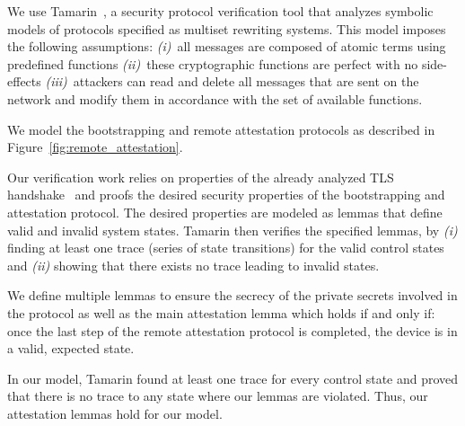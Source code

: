 We use Tamarin~\cite{tamarin-prover}, a security protocol verification tool that analyzes symbolic models of protocols specified as multiset rewriting systems. This model imposes the following assumptions: \emph{(i)}~all messages are composed of atomic terms using predefined functions  \emph{(ii)}~these cryptographic functions are perfect with no side-effects  \emph{(iii)}~attackers can read and delete all messages that are sent on the network and modify them in accordance with the set of available functions.

 We model the bootstrapping and remote attestation protocols as described in Figure~\ref{fig:remote_attestation}.


Our verification work relies on properties of the already analyzed TLS handshake~\cite{tamarin_tls_proof} and proofs the desired security properties of the \projecttitle{} bootstrapping and attestation protocol.  The desired properties are modeled as lemmas that define valid and invalid system states. Tamarin then verifies the specified lemmas, by \emph{(i)} finding at least one trace  (series of state transitions) for the valid control states and \emph{(ii)} showing that there exists no trace leading to invalid states.

We define multiple lemmas to ensure the secrecy of the private secrets involved in the protocol as well as the main attestation lemma which holds if and only if: once the last step of the remote attestation protocol is completed, the \projecttitle{} device is in a valid, expected state. 

In our model, Tamarin found at least one trace for every control state and proved that there is no trace to any state where our lemmas are violated. Thus, our attestation lemmas hold for our model.




